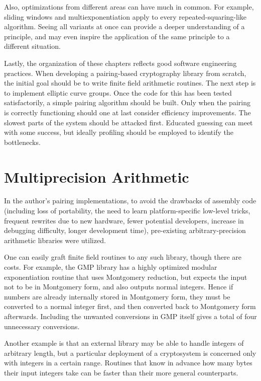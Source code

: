 Also, optimizations from different areas can have much in common. For example,
sliding windows and multiexponentiation apply to every repeated-squaring-like
algorithm. Seeing all variants at once can provide a deeper understanding of
a principle, and may even inspire the application of the same principle to a
different situation.

Lastly, the organization of these chapters reflects good software
engineering practices. When developing a pairing-based cryptography
library from scratch,
the initial goal should be to write finite field arithmetic
routines. The next step is to implement elliptic curve groups.
Once the code for this has been tested satisfactorily, a simple
pairing algorithm should be built.
Only when the pairing is correctly functioning
should one at last consider efficiency improvements.
The slowest parts of the system should be attacked first.
Educated guessing can meet with some success, but
ideally profiling should be employed to identify the
bottlenecks.

\section{Multiprecision Arithmetic}

In the author's pairing implementations, to avoid the drawbacks
of assembly code (including
loss of portability, the need to learn platform-specific
low-level tricks, frequent rewrites due to new hardware,
fewer potential developers, increase in debugging difficulty, longer
development time),
pre-existing arbitrary-precision arithmetic libraries
were utilized.

One can easily graft finite field routines to any such library,
though there are costs.
For example, the GMP library has a highly optimized modular exponentiation
routine that uses Montgomery reduction,
but expects the input not to be
in Montgomery form, and also outputs normal integers.
Hence if numbers are already internally stored in Montgomery form,
they must be converted to a normal integer first, and then converted
back to Montgomery form afterwards. Including the unwanted conversions in
GMP itself gives a total of four unnecessary conversions.

Another example is that an external library may be able to handle integers
of arbitrary length, but a particular deployment of a cryptosystem is
concerned only with integers in a certain range. Routines that know
in advance how many bytes their input integers take can be faster than
their more general counterparts.

